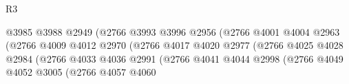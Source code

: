 \begin{lexlean}{R3}
\begin{coremodule}
                                                      @3985
                                                      @3988
                                                      @2949
                                                      (@2766
                                                        @3993
                                                        @3996
                                                        @2956
                                                        (@2766
                                                          @4001
                                                          @4004
                                                          @2963
                                                          (@2766
                                                            @4009
                                                            @4012
                                                            @2970
                                                            (@2766
                                                              @4017
                                                              @4020
                                                              @2977
                                                              (@2766
                                                                @4025
                                                                @4028
                                                                @2984
                                                                (@2766
                                                                  @4033
                                                                  @4036
                                                                  @2991
                                                                  (@2766
                                                                    @4041
                                                                    @4044
                                                                    @2998
                                                                    (@2766
                                                                      @4049
                                                                      @4052
                                                                      @3005
                                                                      (@2766
                                                                        @4057
                                                                        @4060

\end{coremodule}
\end{lexlean}
